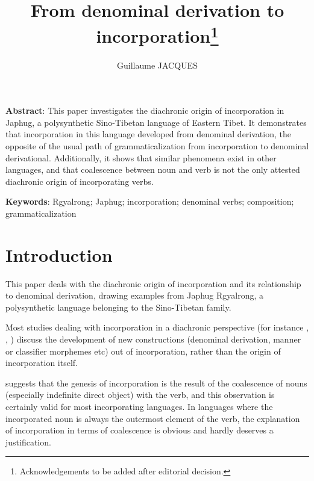 \documentclass[oldfontcommands,oneside,a4paper,11pt]{article}
\begin{document}
\title{From denominal derivation to incorporation\footnote{Acknowledgements to be added after editorial decision.}} 

\author{Guillaume JACQUES}
\maketitle

\textbf{Abstract}: This paper investigates the diachronic origin of incorporation in Japhug, a polysynthetic Sino-Tibetan language of Eastern Tibet. It demonstrates that incorporation in this language developed from denominal derivation, the opposite of the usual path of grammaticalization   from incorporation to denominal derivational. Additionally, it shows that similar phenomena exist in other languages, and that coalescence between noun and verb is not the only attested diachronic origin of incorporating verbs. 

\textbf{Keywords}: Rgyalrong; Japhug; incorporation; denominal verbs; composition; grammaticalization
 



\section{Introduction}
This paper deals with the diachronic origin of incorporation and its relationship to denominal derivation, drawing examples from Japhug Rgyalrong, a polysynthetic language belonging to the Sino-Tibetan family.


Most studies dealing with incorporation in a diachronic perspective (for instance \citealt{mattissen06ontology}, \citealt{haugen08incorp}, \citealt{mithun09poly}) discuss the development of new constructions (denominal derivation, manner or classifier morphemes etc) out of incorporation, rather than the origin of incorporation itself.  

\citet[872]{mithun84incorp} suggests that the genesis of incorporation is the result of the coalescence of nouns (especially indefinite direct object) with the verb, and this observation is certainly valid for most incorporating languages. In languages where the incorporated noun is always the outermost element of the verb,  the explanation of incorporation in terms of coalescence is obvious and hardly deserves a justification. 
\end{document}
